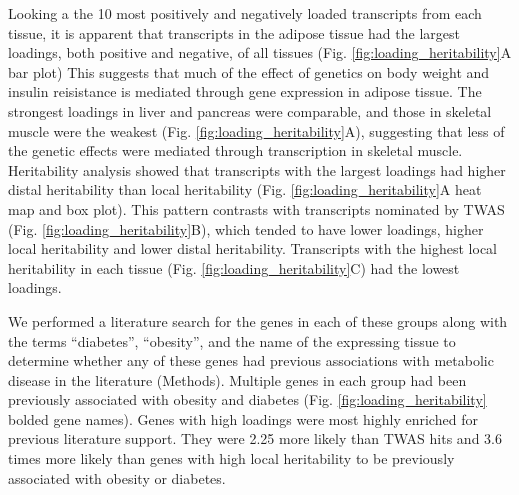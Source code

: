 \documentclass[
]{article}
\begin{document}
Looking a the 10 most positively and negatively loaded transcripts from
each tissue, it is apparent that transcripts in the adipose tissue had
the largest loadings, both positive and negative, of all tissues (Fig.
\ref{fig:loading_heritability}A bar plot) This suggests that much of the
effect of genetics on body weight and insulin reisistance is mediated
through gene expression in adipose tissue. The strongest loadings in
liver and pancreas were comparable, and those in skeletal muscle were
the weakest (Fig. \ref{fig:loading_heritability}A), suggesting that less
of the genetic effects were mediated through transcription in skeletal
muscle. Heritability analysis showed that transcripts with the largest
loadings had higher distal heritability than local heritability (Fig.
\ref{fig:loading_heritability}A heat map and box plot). This pattern
contrasts with transcripts nominated by TWAS (Fig.
\ref{fig:loading_heritability}B), which tended to have lower loadings,
higher local heritability and lower distal heritability. Transcripts
with the highest local heritability in each tissue (Fig.
\ref{fig:loading_heritability}C) had the lowest loadings.

We performed a literature search for the genes in each of these groups
along with the terms ``diabetes'', ``obesity'', and the name of the
expressing tissue to determine whether any of these genes had previous
associations with metabolic disease in the literature (Methods).
Multiple genes in each group had been previously associated with obesity
and diabetes (Fig. \ref{fig:loading_heritability} bolded gene names).
Genes with high loadings were most highly enriched for previous
literature support. They were 2.25 more likely than TWAS hits and 3.6
times more likely than genes with high local heritability to be
previously associated with obesity or diabetes.
\end{document}
